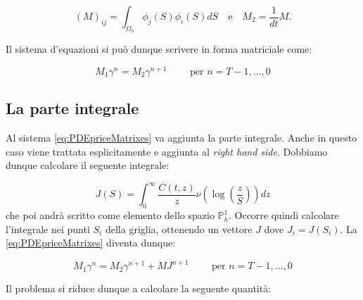 \documentclass[a4paper,10pt]{report}
\theoremstyle{plain}
\theoremstyle{definition}
\theoremstyle{remark}
\begin{document}
\begin{equation*}
(M)_{ij}=\int_{\Omega_h}\phi_j(S)\phi_i(S)dS \quad\text{e}\quad M_2=\frac{1}{dt}M.
\end{equation*}

Il sistema d'equazioni si può dunque scrivere in forma matriciale come:

\begin{equation}
 \label{eq:PDEpriceMatrixes}
 M_1 \gamma^n=M_2\gamma^{n+1} \qquad \text{ per } n=T-1,\dots,0
\end{equation}

\subsection{La parte integrale}
Al sistema \eqref{eq:PDEpriceMatrixes} va aggiunta la parte integrale. Anche in questo caso viene trattata esplicitamente e aggiunta al \emph{right hand side}. Dobbiamo dunque calcolare il seguente integrale:

\begin{equation*}
 J(S)=\int_0^\infty \frac{C(t,z)}{z}\nu\left(\log\left(\frac{z}{S}\right) \right)dz
\end{equation*}
che poi andrà scritto come elemento dello spazio $\mathbb{P}_h^1$. Occorre quindi calcolare l'integrale nei punti $S_i$ della griglia, ottenendo un vettore $J$ dove $J_i=J(S_i)$. La \eqref{eq:PDEpriceMatrixes} diventa dunque: 
 
\begin{equation}
 \label{eq:PDEpriceMatrixeswithJ}
 M_1\gamma^n=M_2\gamma^{n+1}+MJ^{n+1} \qquad \text{ per } n=T-1,\dots,0
\end{equation}

Il problema si riduce dunque a calcolare la seguente quantità:
\end{document}
